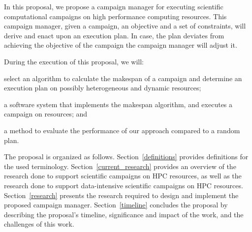 

In this proposal, we propose a campaign manager for executing scientific computational campaigns on high performance computing resources.
This campaign manager, given a campaign, an objective and a set of constraints, will derive and enact upon an execution plan. 
In case, the plan deviates from achieving the objective of the campaign the campaign manager will adjust it.

During the execution of this proposal, we will:
\begin{inparaenum}[(1)]
\item select an algorithm to calculate the makespan of a campaign and determine an execution plan on possibly heterogeneous and dynamic resources;
\item a software system that implements the makespan algorithm, and executes a campaign on resources; and 
\item a method to evaluate the performance of our approach compared to a random plan. 
\end{inparaenum}

The proposal is organized as follows.
Section~\ref{definitions} provides definitions for the used terminology.
Section~\ref{current_research} provides an overview of the research done to support scientific campaigns on HPC resources, as well as the research done to support data-intensive scientific campaigns on HPC resources.
Section~\ref{research} presents the research required to design and implement the proposed campaign manager.
Section~\ref{timeline} concludes the proposal by describing the proposal's timeline, significance and impact of the work, and the challenges of this work.